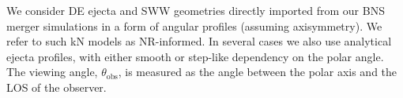 



We consider \ac{DE} ejecta and \ac{SWW} geometries directly imported from 
our \ac{BNS} merger simulations in a form of angular profiles 
(assuming axisymmetry). We refer to such \ac{kN} models as \ac{NR}-informed. 
In several cases we also use analytical ejecta profiles, with 
either smooth or step-like dependency on the polar angle.
%
The viewing angle, $\theta_{\text{obs}}$, is measured as the angle between the 
polar axis and the \ac{LOS} of the observer.













